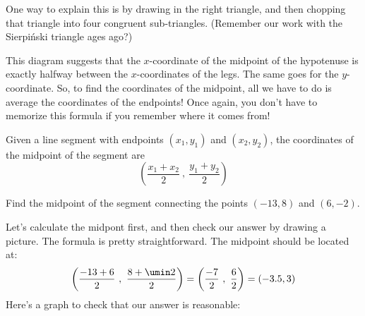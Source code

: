 One way to explain this is by drawing in the right triangle, and then chopping that triangle into four congruent sub-triangles. (Remember our work with the Sierpi\'{n}ski triangle ages ago?)
\begin{center}
\end{center}
This diagram suggests that the $x$-coordinate of the midpoint of the hypotenuse is exactly halfway between the $x$-coordinates of the legs. The same goes for the $y$-coordinate. So, to find the coordinates of the midpoint, all we have to do is average the coordinates of the endpoints! Once again, you don't have to memorize this formula if you remember where it comes from!


\begin{boxeddef}
Given a line segment with endpoints $(x_1, y_1)$ and $(x_2, y_2)$, the coordinates of the midpoint of the segment are \[\left( \frac{x_1+x_2}{2} ~,~ \frac{y_1+y_2}{2} \right)\]
\end{boxeddef}

\begin{boxedex}
Find the midpoint of the segment connecting the points $(-13,8)$ and $(6, -2)$.

 Let's calculate the midpont first, and then check our answer by drawing a picture. The formula is pretty straightforward. The midpoint should be located at: \[\left( \frac{-13+6}{2} ~,~ \frac{8+\umin2}{2} \right) = \left( \frac{-7}{2} ~,~ \frac{6}{2} \right) = (-3.5, 3) \]
Here's a graph to check that our answer is reasonable:
\begin{center}
\end{center}
\end{boxedex}

